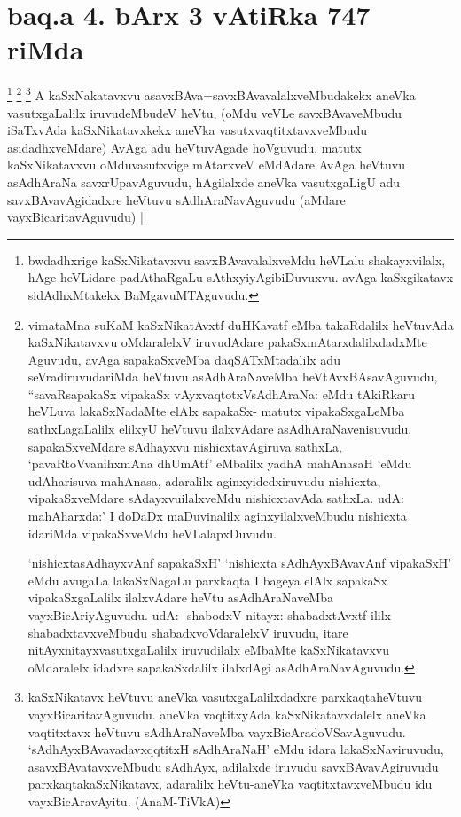 \section*{baq.a 4. bArx 3 vAtiRka 747 riMda}

\begin{artha}
\footnote[1]{bwdadhxrige kaSxNikatavxvu savxBAvavalalxveMdu heVLalu shakayxvilalx, hAge heVLidare padAthaRgaLu sAthxyiyAgibiDuvuxvu. avAga kaSxgikatavx sidAdhxMtakekx BaMgavuMTAguvudu.}
\footnote[2]{vimataMna suKaM kaSxNikatAvxtf duHKavatf eMba takaRdalilx heVtuvAda kaSxNikatavxvu oMdaralelxV iruvudAdare pakaSxmAtarxdalilxdadxMte Aguvudu, avAga sapakaSxveMba daqSATxMtadalilx adu seVradiruvudariMda heVtuvu asAdhAraNaveMba heVtAvxBAsavAguvudu, ``savaRsapakaSx vipakaSx vAyxvaqtotxV\s sAdhAraNa: eMdu tAkiRkaru heVLuva lakaSxNadaMte elAlx sapakaSx- matutx vipakaSxgaLeMba sathxLagaLalilx elilxyU heVtuvu ilalxvAdare asAdhAraNavenisuvudu. sapakaSxveMdare sAdhayxvu nishicxtavAgiruva sathxLa, `pavaRtoVvanihxmAna dhUmAtf' eMbalilx yadhA mahAnasaH `eMdu udAharisuva mahAnasa, adaralilx aginxyidedxiruvudu nishicxta, vipakaSxveMdare sAdayxvuilalxveMdu nishicxtavAda sathxLa. udA: mahAharxda:' I doDaDx maDuvinalilx aginxyilalxveMbudu nishicxta idariMda vipakaSxveMdu heVLalapxDuvudu.

`nishicxtasAdhayxvAnf sapakaSxH' `nishicxta sAdhAyxBAvavAnf vipakaSxH' eMdu avugaLa lakaSxNagaLu parxkaqta I bageya elAlx sapakaSx vipakaSxgaLalilx ilalxvAdare heVtu asAdhAraNaveMba vayxBicAriyAguvudu. udA:- shabodxV nitayx: shabadxtAvxtf ililx shabadxtavxveMbudu shabadxvoVdaralelxV iruvudu, itare nitAyxnitayxvasutxgaLalilx iruvudilalx eMbaMte kaSxNikatavxvu oMdaralelx idadxre sapakaSxdalilx ilalxdAgi asAdhAraNavAguvudu.}
\footnote[3]{kaSxNikatavx heVtuvu aneVka vasutxgaLalilxdadxre parxkaqtaheVtuvu vayxBicaritavAguvudu. aneVka vaqtitxyAda kaSxNikatavxdalelx aneVka vaqtitxtavx heVtuvu sAdhAraNaveMba vayxBicAradoVSavAguvudu. `sAdhAyxBAvavadavxqqtitxH sAdhAraNaH' eMdu idara lakaSxNaviruvudu, asavxBAvatavxveMbudu sAdhAyx, adilalxde iruvudu savxBAvavAgiruvudu parxkaqtakaSxNikatavx, adaralilx heVtu-aneVka vaqtitxtavxveMbudu idu vayxBicAravAyitu. (AnaM-TiVkA)}
A kaSxNakatavxvu asavxBAva=savxBAvavalalxveMbudakekx aneVka vasutxgaLalilx iruvudeMbudeV heVtu, (oMdu veVLe savxBAvaveMbudu iSaTxvAda kaSxNikatavxkekx aneVka vasutxvaqtitxtavxveMbudu asidadhxveMdare) AvAga adu heVtuvAgade hoVguvudu, matutx kaSxNikatavxvu oMduvasutxvige mAtarxveV eMdAdare AvAga heVtuvu asAdhAraNa savxrUpavAguvudu, hAgilalxde aneVka vasutxgaLigU adu savxBAvavAgidadxre heVtuvu sAdhAraNavAguvudu (aMdare vayxBicaritavAguvudu) ||
\end{artha}

